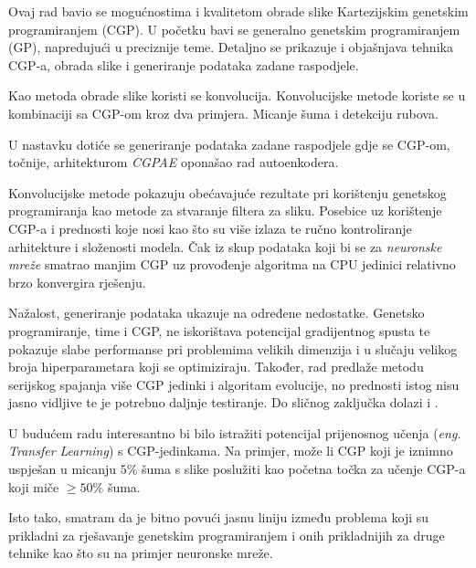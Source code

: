 Ovaj rad bavio se mogućnostima i kvalitetom obrade slike Kartezijskim genetskim programiranjem (CGP).
U početku bavi se generalno genetskim programiranjem (GP), napredujući u preciznije teme.
Detaljno se prikazuje i objašnjava tehnika CGP-a, obrada slike i generiranje podataka zadane raspodjele.

Kao metoda obrade slike koristi se konvolucija.
Konvolucijske metode koriste se u kombinaciji sa CGP-om kroz dva primjera.
Micanje šuma i detekciju rubova.

U nastavku dotiće se generiranje podataka zadane raspodjele gdje se CGP-om, točnije, arhitekturom \emph{CGPAE} oponašao rad autoenkodera.

Konvolucijske metode pokazuju obećavajuće rezultate pri korištenju genetskog programiranja kao metode za stvaranje filtera za sliku.
Posebice uz korištenje CGP-a i prednosti koje nosi kao što su više izlaza te ručno kontroliranje arhitekture i složenosti modela.
Čak iz skup podataka koji bi se za \emph{neuronske mreže} smatrao manjim CGP uz provođenje algoritma na CPU jedinici relativno brzo konvergira rješenju.

Nažalost, generiranje podataka ukazuje na određene nedostatke.
Genetsko programiranje, time i CGP, ne iskorištava potencijal gradijentnog spusta te pokazuje slabe performanse pri problemima velikih dimenzija i u slučaju velikog broja hiperparametara koji se optimiziraju.
Također, rad predlaže metodu serijskog spajanja više CGP jedinki i algoritam evolucije, no prednosti istog nisu jasno vidljive te je potrebno daljnje testiranje.
Do sličnog zaključka dolazi i \cite{conv_gen_programming}.

U budućem radu interesantno bi bilo istražiti potencijal prijenosnog učenja (\emph{eng. Transfer Learning}) s CGP-jedinkama.
Na primjer, može li CGP koji je iznimno uspješan u micanju $5\%$ šuma s slike poslužiti kao početna točka za učenje CGP-a koji miče $\geq 50\%$ šuma.

Isto tako, smatram da je bitno povući jasnu liniju između problema koji su prikladni za rješavanje genetskim programiranjem i onih prikladnijih za druge tehnike kao što su na primjer neuronske mreže.
